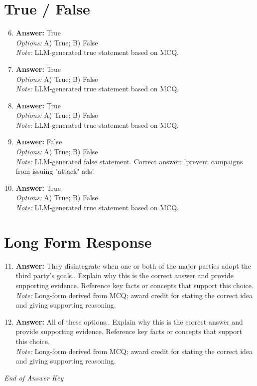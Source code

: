 \documentclass[12pt]{article}
\begin{document}
\section*{True / False}
\begin{enumerate}[label=\arabic*.]
\setcounter{enumi}{5}
\item \textbf{Answer:} True
\\ \textit{Options:} A) True; B) False
\\ \textit{Note:} LLM-generated true statement based on MCQ.
\item \textbf{Answer:} True
\\ \textit{Options:} A) True; B) False
\\ \textit{Note:} LLM-generated true statement based on MCQ.
\item \textbf{Answer:} True
\\ \textit{Options:} A) True; B) False
\\ \textit{Note:} LLM-generated true statement based on MCQ.
\item \textbf{Answer:} False
\\ \textit{Options:} A) True; B) False
\\ \textit{Note:} LLM-generated false statement. Correct answer: 'prevent campaigns from issuing "attack" ads'.
\item \textbf{Answer:} True
\\ \textit{Options:} A) True; B) False
\\ \textit{Note:} LLM-generated true statement based on MCQ.
\end{enumerate}

\section*{Long Form Response}
\begin{enumerate}[label=\arabic*.]
\setcounter{enumi}{10}
\item \textbf{Answer:} They disintegrate when one or both of the major parties adopt the third party's goals.. Explain why this is the correct answer and provide supporting evidence. Reference key facts or concepts that support this choice.
\\ \textit{Note:} Long-form derived from MCQ; award credit for stating the correct idea and giving supporting reasoning.
\item \textbf{Answer:} All of these options.. Explain why this is the correct answer and provide supporting evidence. Reference key facts or concepts that support this choice.
\\ \textit{Note:} Long-form derived from MCQ; award credit for stating the correct idea and giving supporting reasoning.
\end{enumerate}

\vfill
\noindent\textit{End of Answer Key}
\end{document}

